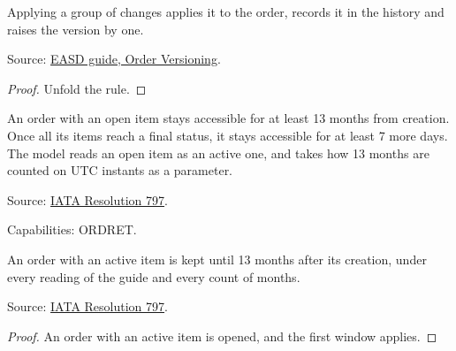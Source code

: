 \begin{theorem}
  \label{thm:order-creation-version-raised}
  Applying a group of changes applies it to the order, records it in the
  history and raises the version by one.

  Source: \href{https://standards.atlassian.net/wiki/spaces/EASD/pages/574259659/Order+Versioning}{EASD guide, Order Versioning}.
\end{theorem}
\begin{proof}
  Unfold the rule.
\end{proof}

\begin{definition}
  \label{def:c23-retention}
  An order with an open item stays accessible for at least 13 months from
  creation.  Once all its items reach a final status, it stays accessible for
  at least 7 more days.  The model reads an open item as an active one, and
  takes how 13 months are counted on UTC instants as a parameter.

  Source: \href{https://www.iata.org/contentassets/72cbd60393ff42b5975d90ce9e049a7d/oneorder-resolution-797.pdf}{IATA Resolution 797}.

  Capabilities: ORDRET.
\end{definition}

\begin{theorem}
  \label{thm:order-creation-keep-from-creation}
  An order with an active item is kept until 13 months after its creation,
  under every reading of the guide and every count of months.

  Source: \href{https://www.iata.org/contentassets/72cbd60393ff42b5975d90ce9e049a7d/oneorder-resolution-797.pdf}{IATA Resolution 797}.
\end{theorem}
\begin{proof}
  An order with an active item is opened, and the first window applies.
\end{proof}

